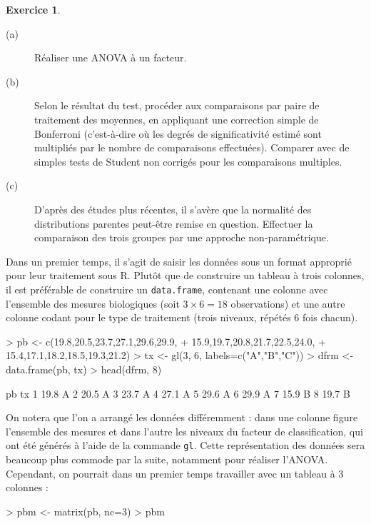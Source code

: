 \documentclass[11pt]{report}
\makeatletter
\theoremstyle{definition}
\newtheorem{exo}{Exercice}[chapter]
\newcommand{\R}{\textsf{R}\xspace}
\newcommand{\foo}[1]{\texttt{#1}}
\newcommand{\cmd}[1]{\index{#1@\foo{#1}}}
\makeatother
\begin{document}
\begin{exo}
\begin{description}
\item[(a)] Réaliser une ANOVA à un facteur.
\item[(b)] Selon le résultat du test, procéder aux comparaisons par paire de
  traitement des moyennes, en appliquant une correction simple de Bonferroni
  (c'est-à-dire où les degrés de significativité estimé sont multipliés par
  le nombre de comparaisons effectuées). Comparer avec de simples tests de
  Student non corrigés pour les comparaisons multiples. 
\item[(c)] D'après des études plus récentes, il s'avère que la normalité des
  distributions parentes peut-être remise en question. Effectuer la
  comparaison des trois groupes par une approche non-paramétrique.
\end{description}
\begin{sol}
Dans un premier temps, il s'agit de saisir les données sous un format
approprié pour leur traitement sous \R. Plutôt que de construire un tableau
à trois colonnes, il est préférable de construire un \texttt{data.frame},
contenant une colonne avec l'ensemble des mesures biologiques (soit $3\times
6=18$ observations) et une autre colonne codant pour le type de traitement
(trois niveaux, répétés 6 fois chacun).
\begin{Schunk}
\begin{Sinput}
> pb <- c(19.8,20.5,23.7,27.1,29.6,29.9,
+         15.9,19.7,20.8,21.7,22.5,24.0,
+         15.4,17.1,18.2,18.5,19.3,21.2)
> tx <- gl(3, 6, labels=c("A","B","C"))
> dfrm <- data.frame(pb, tx)
> head(dfrm, 8)
\end{Sinput}
\begin{Soutput}
    pb tx
1 19.8  A
2 20.5  A
3 23.7  A
4 27.1  A
5 29.6  A
6 29.9  A
7 15.9  B
8 19.7  B
\end{Soutput}
\end{Schunk}
\cmd{gl}\cmd{data.frame}\cmd{head}
On notera que l'on a arrangé les données différemment : dans une colonne
figure l'ensemble des mesures et dans l'autre les niveaux du facteur de
classification, qui ont été générés à l'aide de la commande
\texttt{gl}. Cette représentation des données sera beaucoup plus commode par
la suite, notamment pour réaliser l'ANOVA. Cependant, on pourrait dans un
premier temps travailler avec un tableau à 3 colonnes :
\begin{Schunk}
\begin{Sinput}
> pbm <- matrix(pb, nc=3)
> pbm
\end{Sinput}
\begin{Soutput}

\end{Soutput}
\end{Schunk}
\end{sol}
\end{exo}
\end{document}
